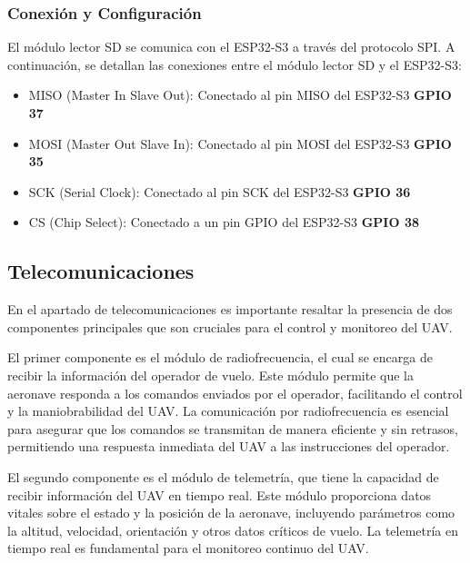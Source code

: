         \subsubsection{Conexión y Configuración}\vspace{5px} 

            El módulo lector SD se comunica con el ESP32-S3 a través del protocolo SPI. A continuación, se detallan las conexiones entre el módulo lector SD y el ESP32-S3:\vspace{5px}

            \begin{itemize}
                \item MISO (Master In Slave Out): Conectado al pin MISO del ESP32-S3   \textbf{GPIO 37}
                \item MOSI (Master Out Slave In): Conectado al pin MOSI del ESP32-S3  \textbf{GPIO 35}
                \item SCK (Serial Clock): Conectado al pin SCK del ESP32-S3        \textbf{GPIO 36}
                \item CS (Chip Select): Conectado a un pin GPIO del ESP32-S3       \textbf{GPIO 38}
            \end{itemize} \vspace{5px}

    \subsection{Telecomunicaciones}\vspace{5px}

        En el apartado de telecomunicaciones es importante resaltar la presencia de dos componentes principales que son cruciales para el control y monitoreo del UAV.\vspace{5px}

        El primer componente es el módulo de radiofrecuencia, el cual se encarga de recibir la información del operador de vuelo. Este módulo permite que la aeronave responda a los comandos enviados por el operador, facilitando el control y la maniobrabilidad del UAV. La comunicación por radiofrecuencia es esencial para asegurar que los comandos se transmitan de manera eficiente y sin retrasos, permitiendo una respuesta inmediata del UAV a las instrucciones del operador.\vspace{5px} 

        El segundo componente es el módulo de telemetría, que tiene la capacidad de recibir información del UAV en tiempo real. Este módulo proporciona datos vitales sobre el estado y la posición de la aeronave, incluyendo parámetros como la altitud, velocidad, orientación y otros datos críticos de vuelo. La telemetría en tiempo real es fundamental para el monitoreo continuo del UAV.\vspace{5px}

